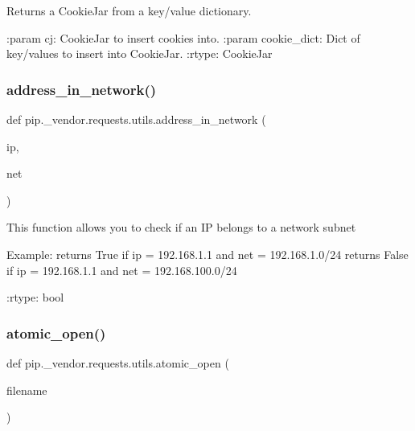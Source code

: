 \begin{DoxyVerb}Returns a CookieJar from a key/value dictionary.

:param cj: CookieJar to insert cookies into.
:param cookie_dict: Dict of key/values to insert into CookieJar.
:rtype: CookieJar
\end{DoxyVerb}
 \mbox{\label{namespacepip_1_1__vendor_1_1requests_1_1utils_a05aa952db08308e80331c871b62a7046}} 
\subsubsection{\texorpdfstring{address\+\_\+in\+\_\+network()}{address\_in\_network()}}
{\footnotesize\ttfamily def pip.\+\_\+vendor.\+requests.\+utils.\+address\+\_\+in\+\_\+network (\begin{DoxyParamCaption}\item[{}]{ip,  }\item[{}]{net }\end{DoxyParamCaption})}

\begin{DoxyVerb}This function allows you to check if an IP belongs to a network subnet

Example: returns True if ip = 192.168.1.1 and net = 192.168.1.0/24
         returns False if ip = 192.168.1.1 and net = 192.168.100.0/24

:rtype: bool
\end{DoxyVerb}
 \mbox{\label{namespacepip_1_1__vendor_1_1requests_1_1utils_a2c01c80f3c6e449ef7919e846f453f13}} 
\subsubsection{\texorpdfstring{atomic\+\_\+open()}{atomic\_open()}}
{\footnotesize\ttfamily def pip.\+\_\+vendor.\+requests.\+utils.\+atomic\+\_\+open (\begin{DoxyParamCaption}\item[{}]{filename }\end{DoxyParamCaption})}

